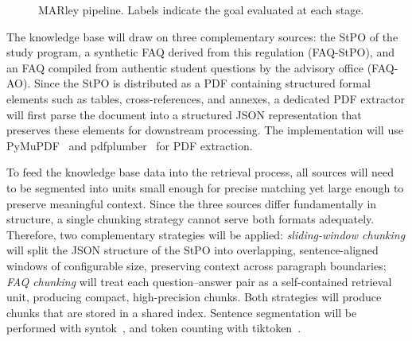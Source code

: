 \documentclass[10pt,twocolumn]{article}
\begin{document}
\begin{figure}[ht]
{%
}
\caption{MARley pipeline. Labels indicate the goal evaluated at each stage.}
\label{fig:architecture}
\end{figure}

The knowledge base will draw on three complementary sources: the StPO of the study program, a synthetic FAQ derived from this regulation (FAQ-StPO), and an FAQ compiled from authentic student questions by the advisory office (FAQ-AO). Since the StPO is distributed as a PDF containing structured formal elements such as tables, cross-references, and annexes, a dedicated PDF extractor will first parse the document into a structured JSON representation that preserves these elements for downstream processing. The implementation will use PyMuPDF~\cite{pymupdf_docs} and pdfplumber~\cite{pdfplumber_repo} for PDF extraction.

To feed the knowledge base data into the retrieval process, all sources will need to be segmented into units small enough for precise matching yet large enough to preserve meaningful context. Since the three sources differ fundamentally in structure, a single chunking strategy cannot serve both formats adequately. Therefore, two complementary strategies will be applied: \emph{sliding-window chunking} will split the JSON structure of the StPO into overlapping, sentence-aligned windows of configurable size, preserving context across paragraph boundaries; \emph{FAQ chunking} will treat each question--answer pair as a self-contained retrieval unit, producing compact, high-precision chunks. Both strategies will produce chunks that are stored in a shared index. Sentence segmentation will be performed with syntok~\cite{syntok_repo}, and token counting with tiktoken~\cite{tiktoken_repo}.
\end{document}
